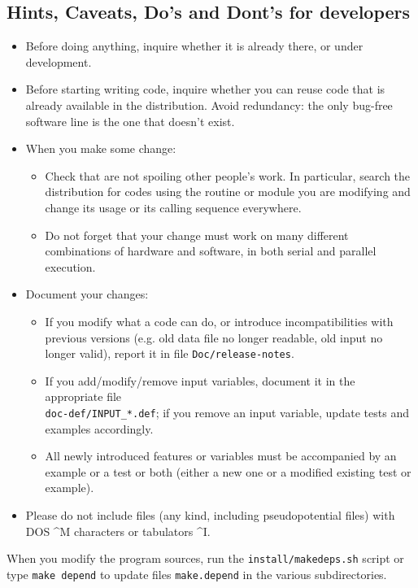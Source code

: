 \documentclass[12pt,a4paper]{article}
\begin{document}
\subsection{Hints, Caveats, Do's and Dont's for developers}

\begin{itemize}
\item Before doing anything, inquire whether it is already there, or under development.
\item Before starting writing code, inquire whether you can reuse code that is already available in the distribution. Avoid redundancy: the only bug-free software line is the one that doesn't exist.
\item When you make some change:
\begin{itemize}
\item Check that are not spoiling other people's work. In particular, search the distribution for codes using the routine or module you are modifying and change its usage or its calling sequence everywhere.
\item Do not forget that your change must work on many different combinations of hardware and software, in both serial and parallel execution.
\end{itemize}
\item Document your changes:
\begin{itemize}
\item If you modify what a code can do, or introduce
incompatibilities with previous versions (e.g. old data file 
no longer readable, old input no longer valid), report it in 
file \texttt{Doc/release-notes}.
\item If you add/modify/remove input variables, document
it in the appropriate file \\
\texttt{doc-def/INPUT\_*.def}; if
you remove an input variable, update tests and examples
accordingly.
\item All newly introduced features or variables must be 
accompanied by an example or a test or both (either a 
new one or a modified existing test or example).
\end{itemize}
\item Please do not include files (any kind, including
pseudopotential files) with DOS \^{}M characters or 
tabulators \^{}I. 
\end{itemize}
When you modify the program sources, run the
\texttt{install/makedeps.sh}  script  or type \texttt{make depend} 
to update files \texttt{make.depend} in the various 
subdirectories.
\end{document}
